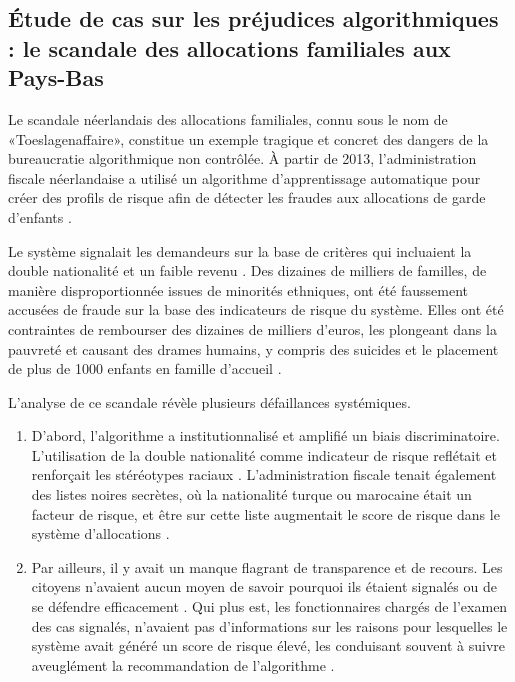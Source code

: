 \subsection{Étude de cas sur les préjudices algorithmiques : le scandale des allocations familiales aux Pays-Bas}

Le scandale néerlandais des allocations familiales, connu sous le nom de «Toeslagenaffaire», constitue un exemple tragique et concret des dangers de la bureaucratie algorithmique non contrôlée. À partir de 2013, l'administration fiscale néerlandaise a utilisé un algorithme d'apprentissage automatique pour créer des profils de risque afin de détecter les fraudes aux allocations de garde d'enfants \citet{Heikkilä2023How}.

Le système signalait les demandeurs sur la base de critères qui incluaient la double nationalité et un faible revenu \citet{Heikkilä2023How}. Des dizaines de milliers de familles, de manière disproportionnée issues de minorités ethniques, ont été faussement accusées de fraude sur la base des indicateurs de risque du système. Elles ont été contraintes de rembourser des dizaines de milliers d'euros, les plongeant dans la pauvreté et causant des drames humains, y compris des suicides et le placement de plus de 1000 enfants en famille d'accueil \citep{TaxAdmin.ai2025The, AmnestyInternational2021}.

L'analyse de ce scandale révèle plusieurs défaillances systémiques. 
\begin{enumerate}
    \item D'abord, l'algorithme a institutionnalisé et amplifié un biais discriminatoire. L'utilisation de la double nationalité comme indicateur de risque reflétait et renforçait les stéréotypes raciaux \citep{Alrefai2025The}. 
    L'administration fiscale tenait également des listes noires secrètes, où la nationalité turque ou marocaine était un facteur de risque, et être sur cette liste augmentait le score de risque dans le système d'allocations \citet{Heikkilä2023How}. 
    \item  Par ailleurs, il y avait un manque flagrant de transparence et de recours. Les citoyens n'avaient aucun moyen de savoir pourquoi ils étaient signalés ou de se défendre efficacement \citet{Heikkilä2023How}. Qui plus est, les fonctionnaires chargés de l'examen des cas signalés, n'avaient pas d'informations sur les raisons pour lesquelles le système avait généré un score de risque élevé, les conduisant souvent à suivre aveuglément la recommandation de l'algorithme \citet{AmnestyInternational2021}.
\end{enumerate}

